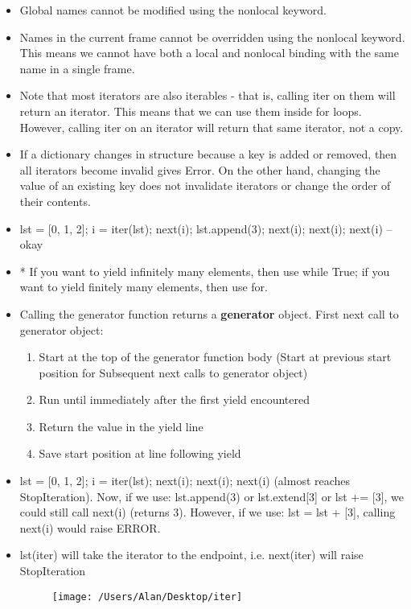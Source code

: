 \documentclass{article}
\begin{document}
\begin{itemize}
	\item Global names cannot be modified using the nonlocal keyword.
	\item Names in the current frame cannot be overridden using the nonlocal keyword. This means we cannot have both a local and nonlocal binding with the same name in a single frame.
	\item Note that most iterators are also iterables - that is, calling iter on them will return an iterator. This means that we can use them inside for loops. However, calling iter on an iterator will return that same iterator, not a copy.
	\item If a dictionary changes in structure because a key is added or removed, then all iterators become invalid gives Error. On the other hand, changing the value of an existing key does not invalidate iterators or change the order of their contents.
	\item lst = [0, 1, 2]; i = iter(lst); next(i); lst.append(3); next(i); next(i); next(i) -- okay
	\item {\color{red} *} If you want to yield infinitely many elements, then use while True; if you want to yield finitely many elements, then use for.
	\item Calling the generator function returns a \textbf{generator} object. First next call to generator object:
	\begin{enumerate}
		\item Start at the top of the generator function body (Start at previous start position for Subsequent next calls to generator object)
		\item Run until immediately after the first yield encountered
		\item Return the value in the yield line
		\item Save start position at line following yield
	\end{enumerate}
	\item lst = [0, 1, 2]; i = iter(lst); next(i); next(i); next(i) (almost reaches StopIteration). Now, if we use: lst.append(3) or lst.extend[3] or lst += [3], we could still call next(i) (returns 3). However, if we use: lst = lst + [3], calling next(i) would raise ERROR.
	\item lst(iter) will take the iterator to the endpoint, i.e. next(iter) will raise StopIteration

\begin{figure} [h!]
\begin{center}
	\texttt{[image: /Users/Alan/Desktop/iter]}
	\label{fig}
\end{center}
\end{figure}
\end{itemize}
\end{document}
